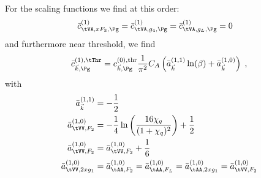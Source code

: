 For the scaling functions we find at this order:
\begin{align}
\bar c_{\tVA,xF_3,\Pg}^{(1)} &= \bar c_{\tVA,g_4,\Pg}^{(1)} = \bar c_{\tVA,g_L,\Pg}^{(1)} = 0
\end{align}
and furthermore near threshold, we find
\begin{equation}
\bar c_{\vec k,\Pg}^{(1),\tThr} = c_{\vec k,\Pg}^{(0),\text{thr}} \frac{1}{\pi^2}
     C_A\left(\bar a_{\vec k}^{(1,1)}\ln(\beta) + \bar a_{\vec k}^{(1,0)}\right)\;,
\end{equation} 
with
\begin{align}
\bar a^{(1,1)}_{\vec k} &= -\frac 1 2\\
\bar a^{(1,0)}_{\tVV,F_2} &= -\frac 1 4 \ln\left(\frac{16\chi_q}{(1+\chi_q)^2}\right)+\frac 1 2\\
\bar a^{(1,0)}_{\tVV,F_2} &= \bar a^{(1,0)}_{\tVV,F_2} + \frac 1 6\\
\bar a^{(1,0)}_{\tVV,2xg_1} &= \bar a^{(1,0)}_{\tAA,F_2} = \bar a^{(1,0)}_{\tAA,F_L} = \bar a^{(1,0)}_{\tAA,2xg_1}= \bar a^{(1,0)}_{\tVV,F_2}
\end{align}

